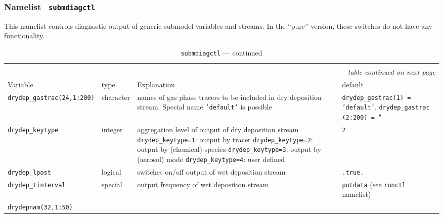 \subsubsection{Namelist {\tt
    submdiagctl}}\label{secsubmdiagctl} 

This namelist controls diagnostic output of generic submodel variables
and streams. In the ``pure'' \echam{} version, these switches do not
have any functionality. 

\setlength{\LTcapwidth}{\textwidth}
\setlength{\LTleft}{0pt}\setlength{\LTright}{0pt}

\begin{longtable}{l@{\extracolsep\fill}lp{5.0cm}p{3.0cm}}\hline\hline
\caption[Namelist {\tt submdiagctl}]{Namelist
  {\tt submdiagctl}}\\\hline\label{tabsubmdiagctl}
\endfirsthead
\caption[]{{\tt submdiagctl} --- continued}\\\hline
\endhead
\hline\multicolumn{4}{r}{\slshape table continued on next page}\\
\endfoot
\hline %
\endlastfoot
Variable & type & Explanation & default \\\hline
{\tt drydep\_gastrac(24,1:200)}
\index{namelist variables!drydep\_gastrac}
 & character & names of gas phase
  tracers to be included in
  dry deposition stream. Special name {\tt 'default'} is possible 
  & {\tt drydep\_gastrac(1) = 'default'}, {\tt drydep\_gastrac (2:200) = ''}\\
{\tt drydep\_keytype}\index{namelist variables!drydep\_keytype}
 & integer & aggregation level of
  output of dry deposition stream \newline
  {\tt drydep\_keytype=1}: output by tracer\newline
  {\tt drydep\_keytype=2}: output by (chemical) species\newline
  {\tt drydep\_keytype=3}: output by (aerosol) mode\newline
  {\tt drydep\_keytype=4}: user defined
  & {\tt 2}\\
{\tt drydep\_lpost}\index{namelist variables!drydep\_lpost}
 & logical & switches on/off output of wet deposition stream
  & {\tt .true.} \\
{\tt drydep\_tinterval}\index{namelist variables!drydep\_tinterval}
 & special & output frequency of wet deposition stream
  & {\tt putdata} (see {\tt runctl} namelist) \\
{\tt drydepnam(32,1:50)}\index{namelist variables!drydepnam}

\end{longtable}
